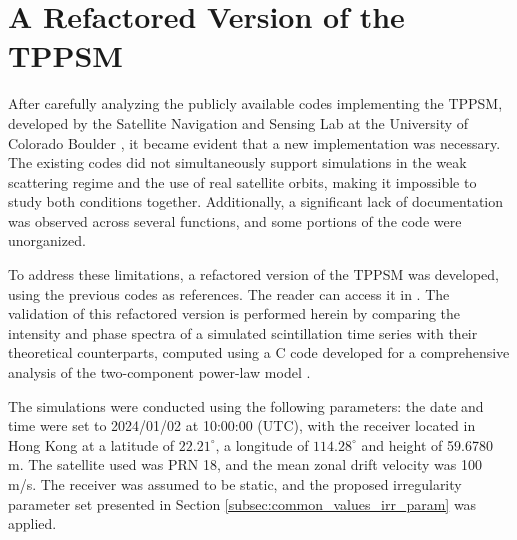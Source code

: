 \section{A Refactored Version of the TPPSM}
\label{sec:refactored_TPPSM}
After carefully analyzing the publicly available codes implementing the TPPSM, developed by the Satellite Navigation and Sensing Lab at the University of Colorado Boulder \cite{githubGitHubCusenselabgnssscintillationsimulator} \cite{githubGitHubCusenselabgnssscintillationsimulator_2param}, it became evident that a new implementation was necessary. The existing codes did not simultaneously support simulations in the weak scattering regime and the use of real satellite orbits, making it impossible to study both conditions together. Additionally, a significant lack of documentation was observed across several functions, and some portions of the code were unorganized.

To address these limitations, a refactored version of the TPPSM was developed, using the previous codes as references. The reader can access it in \cite{githubGitHubRodrigodelimafgnssscintillationsimulator}. The validation of this refactored version is performed herein by comparing the intensity and phase spectra of a simulated scintillation time series with their theoretical counterparts, computed using a C code developed for a comprehensive analysis of the two-component power-law model \cite{Carrano2016OverviewOfTwoComponentPowerLaw}.

The simulations were conducted using the following parameters: the date and time were set to 2024/01/02 at 10:00:00 (UTC), with the receiver located in Hong Kong at a latitude of $22.21^\circ$, a longitude of $114.28^\circ$ and height of 59.6780 m. The satellite used was PRN 18, and the mean zonal drift velocity was 100 m/s. The receiver was assumed to be static, and the proposed irregularity parameter set presented in Section \ref{subsec:common_values_irr_param} was applied.

